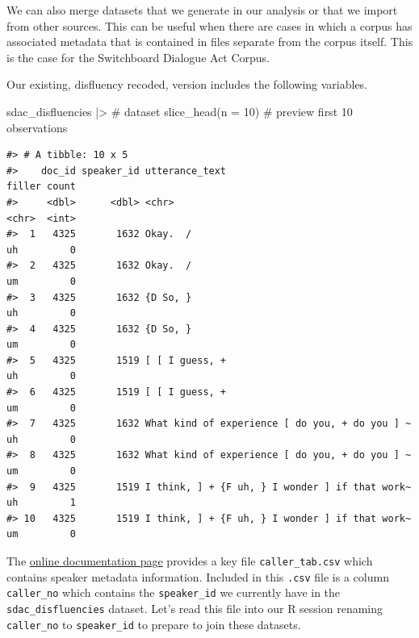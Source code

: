 \documentclass[
  letterpaper,
]{latex/krantz}
\newenvironment{Shaded}{\begin{snugshade}}{\end{snugshade}}
\newcommand{\AttributeTok}[1]{\textcolor[rgb]{0.40,0.45,0.13}{#1}}
\newcommand{\CommentTok}[1]{\textcolor[rgb]{0.37,0.37,0.37}{#1}}
\newcommand{\DecValTok}[1]{\textcolor[rgb]{0.68,0.00,0.00}{#1}}
\newcommand{\FunctionTok}[1]{\textcolor[rgb]{0.28,0.35,0.67}{#1}}
\newcommand{\NormalTok}[1]{\textcolor[rgb]{0.00,0.23,0.31}{#1}}
\newcommand{\SpecialCharTok}[1]{\textcolor[rgb]{0.37,0.37,0.37}{#1}}
\begin{document}
We can also merge datasets that we generate in our analysis or that we
import from other sources. This can be useful when there are cases in
which a corpus has associated metadata that is contained in files
separate from the corpus itself. This is the case for the Switchboard
Dialogue Act Corpus.

Our existing, disfluency recoded, version includes the following
variables.

\begin{Shaded}
\begin{Highlighting}[]
\NormalTok{sdac\_disfluencies }\SpecialCharTok{|\textgreater{}} \CommentTok{\# dataset}
  \FunctionTok{slice\_head}\NormalTok{(}\AttributeTok{n =} \DecValTok{10}\NormalTok{) }\CommentTok{\# preview first 10 observations}
\end{Highlighting}
\end{Shaded}

\begin{verbatim}
#> # A tibble: 10 x 5
#>    doc_id speaker_id utterance_text                                 filler count
#>     <dbl>      <dbl> <chr>                                          <chr>  <int>
#>  1   4325       1632 Okay.  /                                       uh         0
#>  2   4325       1632 Okay.  /                                       um         0
#>  3   4325       1632 {D So, }                                       uh         0
#>  4   4325       1632 {D So, }                                       um         0
#>  5   4325       1519 [ [ I guess, +                                 uh         0
#>  6   4325       1519 [ [ I guess, +                                 um         0
#>  7   4325       1632 What kind of experience [ do you, + do you ] ~ uh         0
#>  8   4325       1632 What kind of experience [ do you, + do you ] ~ um         0
#>  9   4325       1519 I think, ] + {F uh, } I wonder ] if that work~ uh         1
#> 10   4325       1519 I think, ] + {F uh, } I wonder ] if that work~ um         0
\end{verbatim}

The \href{https://catalog.ldc.upenn.edu/docs/LDC97S62/}{online
documentation page} provides a key file \texttt{caller\_tab.csv} which
contains speaker metadata information. Included in this \texttt{.csv}
file is a column \texttt{caller\_no} which contains the
\texttt{speaker\_id} we currently have in the
\texttt{sdac\_disfluencies} dataset. Let's read this file into our R
session renaming \texttt{caller\_no} to \texttt{speaker\_id} to prepare
to join these datasets.
\end{document}

